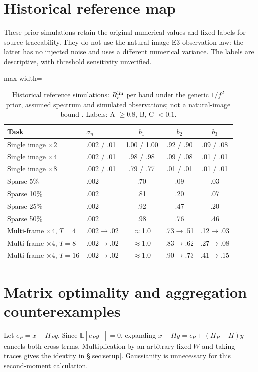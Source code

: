 \section{Historical reference map}\label{app:map}
These prior simulations retain the original numerical values and fixed labels for source traceability. They do not use the natural-image E3 observation law: the latter has no injected noise and uses a different numerical variance. The labels are descriptive, with threshold sensitivity unverified.
\begin{table}[t]\centering\small
\caption{Historical reference simulations: $R_b^{\mathrm{lin}}$ per band under the generic
$1/f^2$ prior, assumed spectrum and simulated observations; not a natural-image bound .
Labels: A $\ge0.8$, B, C $<0.1$.}\label{tab:map}
\begin{adjustbox}{max width=\linewidth}\begin{tabular}{llccc}\toprule
Task & $\sigma_n$ & $b_1$ & $b_2$ & $b_3$\\\midrule
Single image $\times2$ & .002 / .01 & 1.00 / 1.00 & .92 / .90 & .09 / .08\\
Single image $\times4$ & .002 / .01 & .98 / .98 & .09 / .08 & .01 / .01\\
Single image $\times8$ & .002 / .01 & .79 / .77 & .01 / .01 & .01 / .01\\
Sparse 5\% & .002 & .70 & .09 & .03\\
Sparse 10\% & .002 & .81 & .20 & .07\\
Sparse 25\% & .002 & .92 & .47 & .20\\
Sparse 50\% & .002 & .98 & .76 & .46\\
Multi-frame $\times4$, $T{=}4$ & .002$\to$.02 & $\approx$1.0 & .73$\to$.51 & .12$\to$.03\\
Multi-frame $\times4$, $T{=}8$ & .002$\to$.02 & $\approx$1.0 & .83$\to$.62 & .27$\to$.08\\
Multi-frame $\times4$, $T{=}16$ & .002$\to$.02 & $\approx$1.0 & .90$\to$.73 & .41$\to$.15\\
\bottomrule\end{tabular}\end{adjustbox}
\end{table}


\section{Matrix optimality and aggregation counterexamples}
Let $e_P=x-H_Py$. Since $\mathbb E[e_Py^\top]=0$, expanding
$x-Hy=e_P+(H_P-H)y$ cancels both cross terms. Multiplication by an arbitrary
fixed $W$ and taking traces gives the identity in \S\ref{sec:setup}.
Gaussianity is unnecessary for this second-moment calculation.

